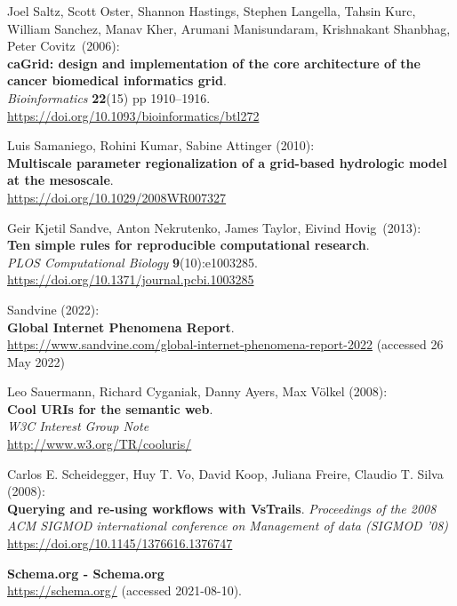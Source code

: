 \begin{thebibliography}{9}
Joel Saltz, Scott Oster, Shannon Hastings, Stephen Langella,
Tahsin Kurc, William Sanchez, Manav Kher, Arumani Manisundaram,
Krishnakant Shanbhag, Peter Covitz~(2006):\\
\textbf{caGrid: design and implementation of the core architecture of
the cancer biomedical informatics grid}.\\
\emph{Bioinformatics}
\textbf{22}(15) pp 1910--1916.\\
\url{https://doi.org/10.1093/bioinformatics/btl272}

Luis Samaniego, Rohini Kumar, Sabine Attinger (2010):\\
\textbf{Multiscale parameter regionalization of a grid-based hydrologic model at the mesoscale}.\\
\url{https://doi.org/10.1029/2008WR007327}

Geir Kjetil Sandve, Anton Nekrutenko, James Taylor, Eivind Hovig~(2013):\\
\textbf{Ten simple rules for reproducible computational research}.\\
\emph{PLOS Computational Biology} \textbf{9}(10):e1003285.\\
\url{https://doi.org/10.1371/journal.pcbi.1003285}

Sandvine (2022): \\
\textbf{Global Internet Phenomena Report}.\\
\url{https://www.sandvine.com/global-internet-phenomena-report-2022}
(accessed 26 May 2022)

Leo Sauermann, Richard Cyganiak, Danny Ayers, Max Völkel (2008): \\
\textbf{Cool URIs for the semantic web}.\\
\emph{W3C Interest Group Note}\\
\url{http://www.w3.org/TR/cooluris/}

 Carlos E. Scheidegger, Huy T. Vo, David Koop, Juliana Freire, Claudio T. Silva (2008):\\
\textbf{Querying and re-using workflows with VsTrails}.
\emph{Proceedings of the 2008 ACM SIGMOD international conference on Management of data (SIGMOD '08)}\\
\url{https://doi.org/10.1145/1376616.1376747}

\textbf{Schema.org - Schema.org}\\
\url{https://schema.org/} (accessed 2021-08-10).


\end{thebibliography}
